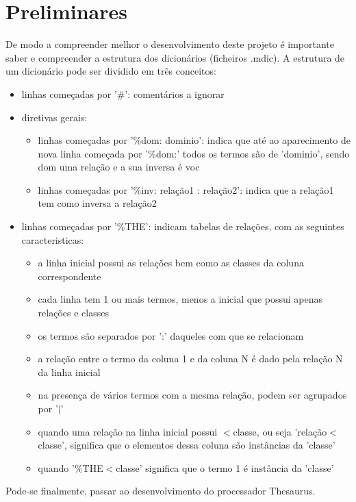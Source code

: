 \documentclass{llncs}
\begin{document}
\section{Preliminares}
De modo a compreender melhor o desenvolvimento deste projeto é importante saber e compreender a estrutura dos dicionários (ficheiros .mdic). 
A estrutura de um dicionário pode ser dividido em três conceitos:
\begin{itemize}
    \item linhas começadas por '\#': comentários a ignorar
    \item diretivas gerais:
        \begin{itemize}
            \item linhas começadas por '\%dom: dominio': indica que até ao aparecimento de nova linha começada por '\%dom:' todos os termos são de 'dominio', sendo dom uma relação e a sua inversa é voc
            \item linhas começadas por '\%inv: relação1 : relação2': indica que a relação1 tem como inversa a relação2
        \end{itemize}
    \item linhas começadas por '\%THE': indicam tabelas de relações, com as seguintes caracteristicas:
        \begin{itemize}
            \item a linha inicial possui as relações bem como as classes da coluna correspondente
            \item cada linha tem 1 ou mais termos, menos a inicial que possui apenas relações e classes
            \item os termos são separados por ':' daqueles com que se relacionam
            \item a relação entre o termo da coluna 1 e da coluna N é dado pela relação N da linha inicial
            \item na presença de vários termos com a mesma relação, podem ser agrupados por '$|$'
            \item quando uma relação na linha inicial possui $<$classe, ou seja 'relação$<$classe', significa que o elementos dessa coluna são instâncias da 'classe'
            \item quando '\%THE$<$classe' significa que o termo 1 é instância da 'classe'
        \end{itemize}
\end{itemize}
Pode-se finalmente, passar ao desenvolvimento do processador Thesaurus.
\end{document}
